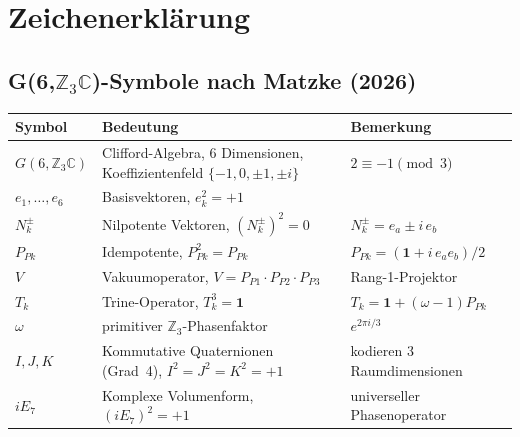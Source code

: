 %

\section*{Zeichenerklärung}

\subsection*{G(6,$\mathbb{Z}_3\mathbb{C}$)-Symbole nach Matzke (2026)}

\begin{center}
\begin{tabular}{lll}
\toprule
Symbol & Bedeutung & Bemerkung \\
\midrule
$G(6,\mathbb{Z}_3\mathbb{C})$ & Clifford-Algebra, 6 Dimensionen,
  Koeffizientenfeld $\{-1,0,\pm1,\pm i\}$ & $2\equiv-1\pmod{3}$ \\
$e_1,\ldots,e_6$ & Basisvektoren, $e_k^2 = +1$ & \\
$N_k^{\pm}$ & Nilpotente Vektoren, $(N_k^{\pm})^2 = 0$ &
  $N_k^{\pm} = e_a \pm i\,e_b$ \\
$P_{Pk}$ & Idempotente, $P_{Pk}^2 = P_{Pk}$ &
  $P_{Pk} = (\mathbf{1}+i\,e_a e_b)/2$ \\
$V$ & Vakuumoperator, $V = P_{P1}\cdot P_{P2}\cdot P_{P3}$ &
  Rang-1-Projektor \\
$T_k$ & Trine-Operator, $T_k^3 = \mathbf{1}$ &
  $T_k = \mathbf{1}+(\omega-1)P_{Pk}$ \\
$\omega$ & primitiver $\mathbb{Z}_3$-Phasenfaktor &
  $e^{2\pi i/3}$ \\
$I,J,K$ & Kommutative Quaternionen (Grad~4), $I^2=J^2=K^2=+1$ &
  kodieren 3 Raumdimensionen \\
$iE_7$ & Komplexe Volumenform, $(iE_7)^2=+1$ & universeller Phasenoperator \\
\bottomrule
\end{tabular}
\end{center}

